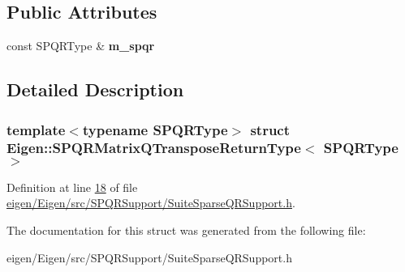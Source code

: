 \subsection*{Public Attributes}
\begin{DoxyCompactItemize}
\item 
\mbox{\label{struct_eigen_1_1_s_p_q_r_matrix_q_transpose_return_type_a1fb3672405efefed9a6425547b737f26}} 
const S\+P\+Q\+R\+Type \& {\bfseries m\+\_\+spqr}
\end{DoxyCompactItemize}


\subsection{Detailed Description}
\subsubsection*{template$<$typename S\+P\+Q\+R\+Type$>$\newline
struct Eigen\+::\+S\+P\+Q\+R\+Matrix\+Q\+Transpose\+Return\+Type$<$ S\+P\+Q\+R\+Type $>$}



Definition at line \hyperlink{eigen_2_eigen_2src_2_s_p_q_r_support_2_suite_sparse_q_r_support_8h_source_l00018}{18} of file \hyperlink{eigen_2_eigen_2src_2_s_p_q_r_support_2_suite_sparse_q_r_support_8h_source}{eigen/\+Eigen/src/\+S\+P\+Q\+R\+Support/\+Suite\+Sparse\+Q\+R\+Support.\+h}.



The documentation for this struct was generated from the following file\+:\begin{DoxyCompactItemize}
\item 
eigen/\+Eigen/src/\+S\+P\+Q\+R\+Support/\+Suite\+Sparse\+Q\+R\+Support.\+h\end{DoxyCompactItemize}
